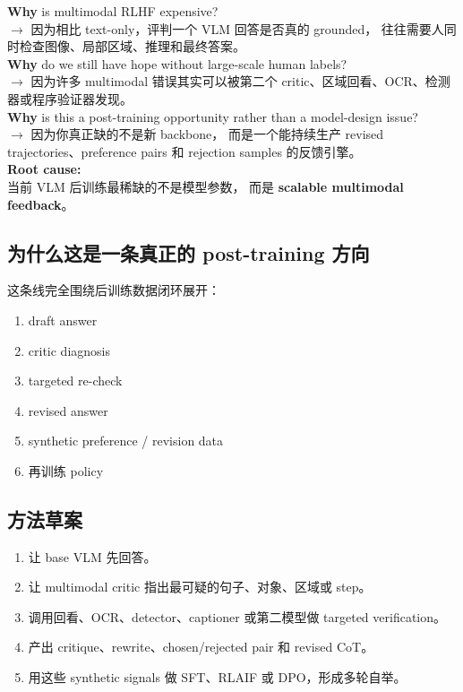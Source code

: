 \documentclass[12pt,a4paper]{article}
\begin{document}
\begin{whybox}
\textbf{Why} is multimodal RLHF expensive?\\
$\rightarrow$ 因为相比 text-only，评判一个 VLM 回答是否真的 grounded，
往往需要人同时检查图像、局部区域、推理和最终答案。\\[3pt]
\textbf{Why} do we still have hope without large-scale human labels?\\
$\rightarrow$ 因为许多 multimodal 错误其实可以被第二个 critic、区域回看、OCR、检测器或程序验证器发现。\\[3pt]
\textbf{Why} is this a post-training opportunity rather than a model-design issue?\\
$\rightarrow$ 因为你真正缺的不是新 backbone，
而是一个能持续生产 revised trajectories、preference pairs 和 rejection samples 的反馈引擎。\\[3pt]
\textbf{Root cause:}\\
当前 VLM 后训练最稀缺的不是模型参数，
而是 \textbf{scalable multimodal feedback}。
\end{whybox}

\subsection{为什么这是一条真正的 post-training 方向}

这条线完全围绕后训练数据闭环展开：
\begin{enumerate}[leftmargin=2em]
  \item draft answer
  \item critic diagnosis
  \item targeted re-check
  \item revised answer
  \item synthetic preference / revision data
  \item 再训练 policy
\end{enumerate}

\subsection{方法草案}

\begin{enumerate}[leftmargin=2em]
  \item 让 base VLM 先回答。
  \item 让 multimodal critic 指出最可疑的句子、对象、区域或 step。
  \item 调用回看、OCR、detector、captioner 或第二模型做 targeted verification。
  \item 产出 critique、rewrite、chosen/rejected pair 和 revised CoT。
  \item 用这些 synthetic signals 做 SFT、RLAIF 或 DPO，形成多轮自举。
\end{enumerate}
\end{document}
